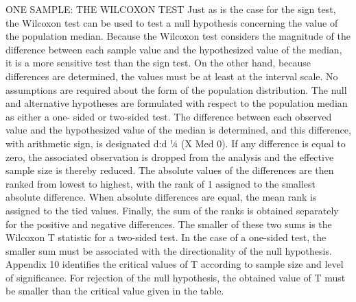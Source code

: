 ONE SAMPLE: THE WILCOXON TEST
Just as is the case for the sign test, the Wilcoxon test can be used to test a null hypothesis concerning the
value of the population median. Because the Wilcoxon test considers the magnitude of the difference between
each sample value and the hypothesized value of the median, it is a more sensitive test than the sign test. On the
other hand, because differences are determined, the values must be at least at the interval scale. No assumptions
are required about the form of the population distribution.
The null and alternative hypotheses are formulated with respect to the population median as either a one-
sided or two-sided test. The difference between each observed value and the hypothesized value of the median
is determined, and this difference, with arithmetic sign, is designated d:d ¼ (X  Med 0). If any difference is
equal to zero, the associated observation is dropped from the analysis and the effective sample size is thereby
reduced. The absolute values of the differences are then ranked from lowest to highest, with the rank of 1
assigned to the smallest absolute difference. When absolute differences are equal, the mean rank is assigned to
the tied values. Finally, the sum of the ranks is obtained separately for the positive and negative differences. The
smaller of these two sums is the Wilcoxon T statistic for a two-sided test. In the case of a one-sided test, the
smaller sum must be associated with the directionality of the null hypothesis. Appendix 10 identifies the critical
values of T according to sample size and level of significance. For rejection of the null hypothesis, the obtained
value of T must be smaller than the critical value given in the table.
